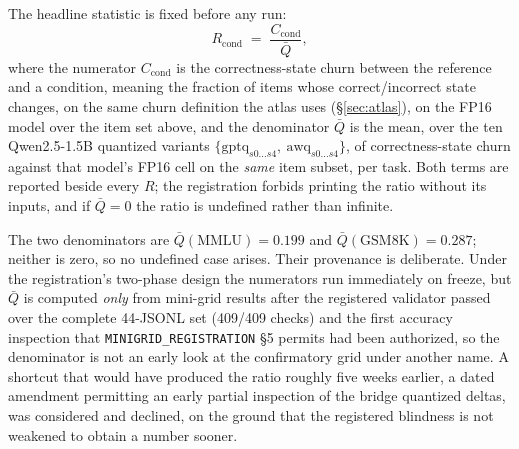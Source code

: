 The headline statistic is fixed before any run:
\begin{equation}
R_{\mathrm{cond}} \;=\; \frac{C_{\mathrm{cond}}}{\bar{Q}},
\label{eq:sensitivity-R}
\end{equation}
where the numerator $C_{\mathrm{cond}}$ is the correctness-state churn between
the reference and a condition, meaning the fraction of items whose
correct/incorrect state changes, on the same churn definition the atlas uses
(\S\ref{sec:atlas}), on the FP16 model over the item set above, and the
denominator $\bar{Q}$ is the mean, over the ten Qwen2.5-1.5B quantized variants
$\{\mathrm{gptq}_{s0\ldots s4},\ \mathrm{awq}_{s0\ldots s4}\}$, of
correctness-state churn against that model's FP16 cell on the \emph{same} item
subset, per task. Both terms are reported beside every $R$; the registration
forbids printing the ratio without its inputs, and if $\bar{Q}=0$ the ratio is
undefined rather than infinite.

The two denominators are
$\bar{Q}(\text{MMLU})=\mathbf{0.199}$ and
$\bar{Q}(\text{GSM8K})=\mathbf{0.287}$; neither is zero, so no undefined case
arises.
Their provenance is deliberate. Under the registration's two-phase design the
numerators run immediately on freeze, but $\bar{Q}$ is computed \emph{only} from
mini-grid results after the registered validator passed over the complete
44-JSONL set (409/409 checks) and the first accuracy inspection that
\texttt{MINIGRID\_REGISTRATION} \S5 permits had been authorized, so the
denominator is not an early look at the confirmatory grid under another name.
A shortcut that would have produced the ratio roughly five weeks earlier, a
dated amendment permitting an early partial inspection of the bridge quantized
deltas, was considered and declined, on the ground that the registered
blindness is not weakened to obtain a number sooner.

